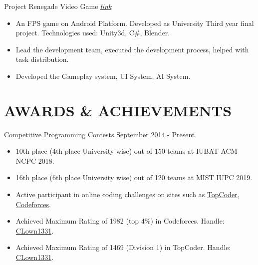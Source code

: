 \documentclass{resumestyle}
\begin{document}
    \projectsubsection%
        {Project Renegade}%
        {Video Game \hfill
        \textit{\href{https://github.com/CLown1331/Unity-FPS/releases/tag/1.0.0/}{\textcolor{link}{link}}}}%
    \begin{itemize}[labelsep=4pt,leftmargin=*,topsep=5pt,partopsep=0pt,itemsep=1pt]%
        \item An FPS game on Android Platform. Developed as University Third year final project. Technologies used: Unity3d, C\#, Blender.
        \item Lead the development team, executed the development process, helped with task distribution.
        \item Developed the Gameplay system, UI System, AI System.
    \end{itemize}%

\vspace{-4pt}

\section{AWARDS \& ACHIEVEMENTS}%

    \worksubsection%
        {Competitive Programming Contests}%
        {September 2014 - Present}%
        {}%
    
    \begin{itemize}[labelsep=4pt,leftmargin=*,topsep=5pt,partopsep=0pt,itemsep=1pt]%
        \item 10th place (4th place University wise) out of 150 teams at IUBAT ACM NCPC 2018.
        \item 16th place (6th place University wise) out of 120 teams at MIST IUPC 2019.
        \item Active participant in online coding challenges on sites such as {\href{https://www.topcoder.com/members/CLown1331/}{TopCoder}}, {\href{http://codeforces.com/profile/CLown1331}{Codeforces}}.
        \item Achieved Maximum Rating of 1982 (top 4\%) in Codeforces. Handle: {\href{http://codeforces.com/profile/CLown1331}{CLown1331}}. 
        \item Achieved Maximum Rating of 1469 (Division 1) in TopCoder. Handle: {\href{https://www.topcoder.com/members/CLown1331/}{CLown1331}}.
    \end{itemize}%
\end{document}

